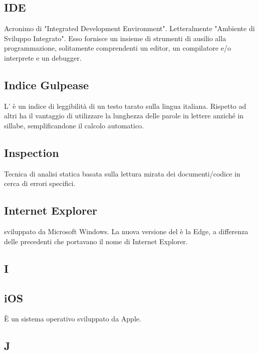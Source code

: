 \subsection*{IDE}
Acronimo di "Integrated Development Environment". Letteralmente "Ambiente
di Sviluppo Integrato". Esso fornisce un insieme di strumenti di ausilio
alla programmazione, solitamente comprendenti un editor, un compilatore e/o
interprete e un debugger.

\subsection*{Indice Gulpease}
L' è un indice di leggibilità di un testo tarato sulla lingua
italiana. Rispetto ad altri ha il vantaggio di utilizzare la lunghezza delle parole in lettere
anziché in sillabe, semplificandone il calcolo automatico.

\subsection*{Inspection }
Tecnica di analisi statica basata sulla lettura mirata dei documenti/codice in cerca di
errori specifici.

\subsection*{Internet Explorer}
  sviluppato da Microsoft Windows. La nuova versione del  è la Edge, a differenza delle precedenti che portavano il nome di Internet Explorer.

\newpage

\begin{center}
\Huge\section*{\uppercase{i}}
\end{center}

\subsection*{iOS}
È un sistema operativo sviluppato da Apple.

\newpage

\begin{center}
\Huge\section*{\uppercase{J}}
\end{center}

